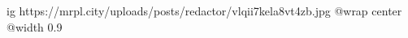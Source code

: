  
 
 
 
 

\ifcmt
  ig https://mrpl.city/uploads/posts/redactor/vlqii7kela8vt4zb.jpg
  @wrap center
  @width 0.9
\fi
